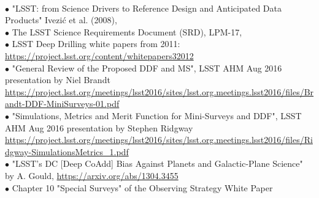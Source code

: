 \documentclass[DM,lsstdraft,toc]{lsstdoc}
\begin{document}
 \\
$\bullet$ "LSST: from Science Drivers to Reference Design and Anticipated Data Products" Ivezi\'{c} et al. (2008), \cite{2008arXiv0805.2366I} \\
$\bullet$ The LSST Science Requirements Document (SRD), LPM-17, \cite{LPM-17} \\
$\bullet$ LSST Deep Drilling white papers from 2011: \url{https://project.lsst.org/content/whitepapers32012} \\
$\bullet$ "General Review of the Proposed DDF and MS", LSST AHM Aug 2016 presentation by Niel Brandt \url{https://project.lsst.org/meetings/lsst2016/sites/lsst.org.meetings.lsst2016/files/Brandt-DDF-MiniSurveys-01.pdf} \\
$\bullet$ "Simulations, Metrics and Merit Function for Mini-Surveys and DDF", LSST AHM Aug 2016 presentation by Stephen Ridgway \url{https://project.lsst.org/meetings/lsst2016/sites/lsst.org.meetings.lsst2016/files/Ridgway-SimulationsMetrics_1.pdf} \\
$\bullet$ "LSST's DC [Deep CoAdd] Bias Against Planets and Galactic-Plane Science" by A. Gould, \cite{2013arXiv1304.3455G} \url{https://arxiv.org/abs/1304.3455} \\
$\bullet$ Chapter 10 "Special Surveys" of the Observing Strategy White Paper \cite{2017arXiv170804058L}
\end{document}
